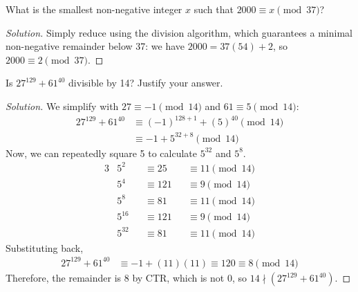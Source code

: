 \documentclass{agony}
\begin{document}
\question What is the smallest non-negative integer $x$ such that $2000 \equiv x \pmod{37}$?
\begin{proof}[Solution]
  Simply reduce using the division algorithm, which guarantees a minimal non-negative remainder below 37:
  we have $2000 = 37(54) + 2$, so $2000 \equiv 2 \pmod{37}$.
\end{proof}



\question Is $27^{129}+61^{40}$ divisible by 14? Justify your answer.
\begin{proof}[Solution]
  We simplify with $27 \equiv -1 \pmod{14}$ and $61 \equiv 5 \pmod{14}$:
  \begin{align*}
    27^{129}+61^{40} & \equiv (-1)^{128+1}+(5)^{40} \pmod{14} \\
                     & \equiv -1 + 5^{32+8} \pmod{14}
  \end{align*}
  Now, we can repeatedly square 5 to calculate $5^{32}$ and $5^8$.
  \begin{alignat*}{3}
     & 5^2    &  & \equiv 25  &  & \equiv 11 \pmod{14} \\
     & 5^4    &  & \equiv 121 &  & \equiv 9 \pmod{14}  \\
     & 5^8    &  & \equiv 81  &  & \equiv 11 \pmod{14} \\
     & 5^{16} &  & \equiv 121 &  & \equiv 9 \pmod{14}  \\
     & 5^{32} &  & \equiv 81  &  & \equiv 11 \pmod{14}
  \end{alignat*}
  Substituting back,
  \begin{align*}
    27^{129}+61^{40} & \equiv -1 + (11)(11) \equiv 120 \equiv 8 \pmod{14}
  \end{align*}
  Therefore, the remainder is 8 by CTR, which is not 0, so $14 \nmid (27^{129}+61^{40})$.
\end{proof}
\end{document}

